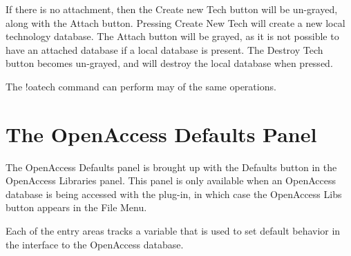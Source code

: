 If there is no attachment, then the {\cb Create new Tech} button will
be un-grayed, along with the {\cb Attach} button.  Pressing {\cb
Create New Tech} will create a new local technology database.  The
{\cb Attach} button will be grayed, as it is not possible to have an
attached database if a local database is present.  The {\cb Destroy
Tech} button becomes un-grayed, and will destroy the local database
when pressed.

The {\cb !oatech} command can perform may of the same operations.


\section{The {\cb OpenAccess Defaults} Panel}
\label{oadefs}

The {\cb OpenAccess Defaults} panel is brought up with the {\cb
Defaults} button in the {\cb OpenAccess Libraries} panel.  This panel
is only available when an OpenAccess database is being accessed with
the plug-in, in which case the {\cb OpenAccess Libs} button appears in
the {\cb File Menu}.

Each of the entry areas tracks a variable that is used to set default
behavior in the interface to the OpenAccess database.

